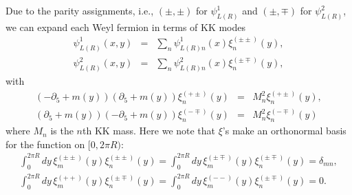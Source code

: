 \documentclass[a4paper,12pt]{article}
\begin{document}
Due to the parity assignments, i.e., $(\pm,\pm)$ for
$\psi^1_{L(R)}$ and $(\pm,\mp)$ for $\psi^2_{L(R)}$, we can expand
each Weyl fermion in terms of KK modes
\begin{eqnarray}
\psi^1_{L(R)}(x,y)&=&\sum_n \psi^1_{L(R)n}(x)\xi^{(\pm\pm)}_n(y), \\
\psi^2_{L(R)}(x,y)&=&\sum_n\psi^2_{L(R)n}(x)\xi^{(\pm\mp)}_n(y),
\end{eqnarray}
with 
\begin{eqnarray}
(-\partial_5+m(y))(\partial_5+m(y))\xi^{(+\pm)}_n(y)
&=&M^2_n\xi^{(+\pm)}_n(y),\\
(\partial_5+m(y))(-\partial_5+m(y))\xi^{(-\mp)}_n(y)
&=&M^2_n\xi^{(-\mp)}_n(y)
\end{eqnarray}
where $M_n$ is the $n$th KK mass.
Here we note that $\xi$'s make an orthonormal basis for the function
on $[0,2\pi R)$:
\begin{eqnarray}
\int_0^{2\pi R}dy\, \xi^{(\pm\pm)}_m(y)\xi^{(\pm\pm)}_n(y)
=\int_0^{2\pi R}dy\, \xi^{(\pm\mp)}_m(y)\xi^{(\pm\mp)}_n(y)=\delta_{mn},\\
\int_0^{2\pi R}dy\, \xi^{(++)}_m(y)\xi^{(\pm\mp)}_n(y)
=\int_0^{2\pi R}dy\, \xi^{(--)}_m(y)\xi^{(\pm\mp)}_n(y)=0.
\end{eqnarray}
\end{document}

